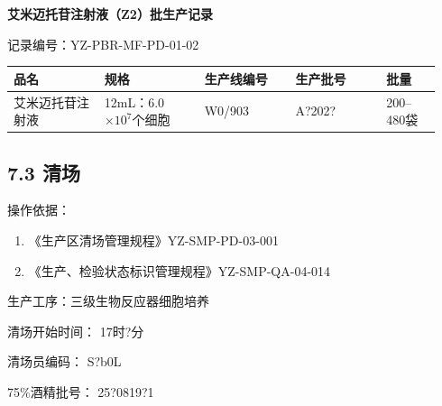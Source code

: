 \documentclass[UTF8,10pt,a4paper,fontset=fandol]{ctexart}
\newcommand{\fieldvalue}[1]{#1}
\newcommand{\handwritten}[1]{#1}
\begin{document}
\newpage

\begin{center}
\textbf{艾米迈托苷注射液（Z2）批生产记录}
\end{center}

\begin{flushright}
记录编号：\fieldvalue{YZ-PBR-MF-PD-01-02}
\end{flushright}

\begin{tabular}{|p{0.20\linewidth}|p{0.22\linewidth}|p{0.20\linewidth}|p{0.20\linewidth}|p{0.12\linewidth}|}
\hline
品名 & 规格 & 生产线编号 & 生产批号 & 批量 \\
\hline
\fieldvalue{艾米迈托苷注射液} &
\fieldvalue{12mL：6.0$\times 10^{7}$个细胞} &
\fieldvalue{\handwritten{W0/903}} &
\fieldvalue{\handwritten{A?202?}} &
\fieldvalue{200--480袋} \\
\hline
\end{tabular}

\subsection*{7.3 清场}

操作依据：

\begin{enumerate}
    \item 《生产区清场管理规程》\hfill YZ-SMP-PD-03-001
    \item 《生产、检验状态标识管理规程》\hfill YZ-SMP-QA-04-014
\end{enumerate}

生产工序：\fieldvalue{三级生物反应器细胞培养}

清场开始时间：
\fieldvalue{\handwritten{17时?分}}

清场员编码：
\fieldvalue{\handwritten{S?b0L}}

75\%酒精批号：
\fieldvalue{\handwritten{25?0819?1}}
\end{document}
